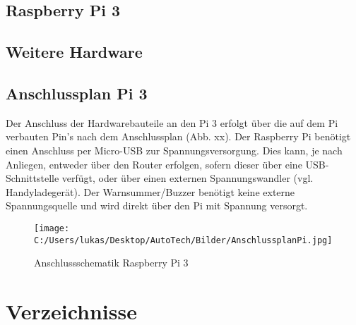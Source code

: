 \documentclass[a4paper,12pt]{article}
\begin{document}
\subsection{Raspberry Pi 3}

\subsection{Weitere Hardware}

\subsection{Anschlussplan Pi 3}
Der Anschluss der Hardwarebauteile an den Pi 3 erfolgt über die auf dem Pi verbauten Pin's nach dem Anschlussplan (Abb. xx). Der Raspberry Pi benötigt einen Anschluss per Micro-USB zur Spannungsversorgung. Dies kann, je nach Anliegen, entweder über den Router erfolgen, sofern dieser über eine USB-Schnittstelle verfügt, oder über einen externen Spannungswandler (vgl. Handyladegerät). Der Warnsummer/Buzzer benötigt keine externe Spannungsquelle und wird direkt über den Pi mit Spannung versorgt.

\begin{figure}[h]	%
\begin{center}
\texttt{[image: C:/Users/lukas/Desktop/AutoTech/Bilder/AnschlussplanPi.jpg]}
\caption{Anschlussschematik Raspberry Pi 3}
\label{Anschlussplan}
\end{center}
\end{figure}

\newpage

\section{Verzeichnisse}
\listoffigures %
\end{document}

